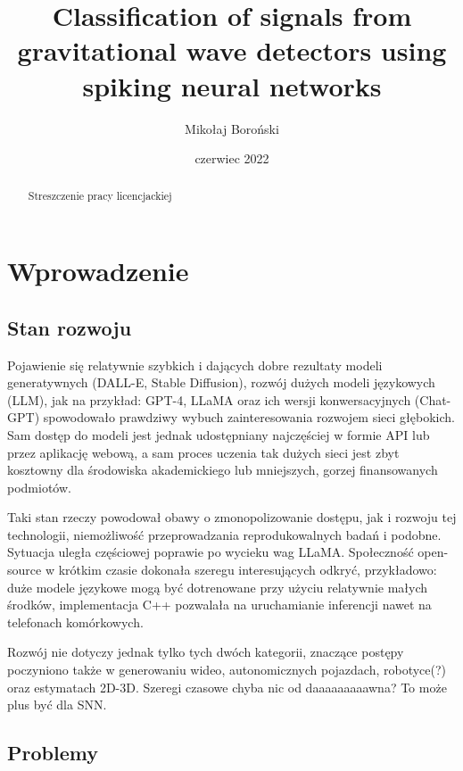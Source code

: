 \documentclass{pracalicmgr2021}
\author{Mikołaj Boroński}
\title{Classification of signals from gravitational wave detectors using spiking neural networks}
\date{czerwiec 2022}
\begin{document}
    \maketitle
    \let\cleardoublepage\clearpage
    
    \begin{abstract}
    Streszczenie pracy licencjackiej
    \end{abstract}

    \tableofcontents

    \chapter{Wprowadzenie}
    \section{Stan rozwoju}
    Pojawienie się relatywnie szybkich i dających dobre rezultaty modeli generatywnych (DALL-E, Stable Diffusion), rozwój dużych modeli językowych (LLM), jak na przykład: GPT-4\cite{gpt1}, LLaMA\cite{llama1} oraz ich wersji konwersacyjnych (Chat-GPT\cite{gpt2}) spowodowało prawdziwy wybuch zainteresowania rozwojem sieci głębokich. Sam dostęp do modeli jest jednak udostępniany najczęściej w formie API\cite{gpt3} lub przez aplikację webową\cite{gpt4}, a sam proces uczenia tak dużych sieci jest zbyt kosztowny dla środowiska akademickiego lub mniejszych, gorzej finansowanych podmiotów.
    
    Taki stan rzeczy powodował obawy o zmonopolizowanie dostępu, jak i rozwoju tej technologii, niemożliwość przeprowadzania reprodukowalnych badań i podobne. Sytuacja uległa częściowej poprawie po wycieku wag LLaMA\cite{llama2}. Społeczność open-source w krótkim czasie dokonała szeregu interesujących odkryć, przykładowo: duże modele językowe mogą być dotrenowane przy użyciu relatywnie małych środków\cite{alpaca1}, implementacja C++ pozwalała na uruchamianie inferencji nawet na telefonach komórkowych\cite{llamacpp1}.
    
    Rozwój nie dotyczy jednak tylko tych dwóch kategorii, znaczące postępy poczyniono także w generowaniu wideo\cite{jakis_model_video}, autonomicznych pojazdach\cite{coś_tesla_lub_waymo}, robotyce(?) oraz estymatach 2D-3D\cite{nerf}. Szeregi czasowe chyba nic od daaaaaaaaawna? To może plus być dla SNN.
    
    \section{Problemy}
\end{document}
